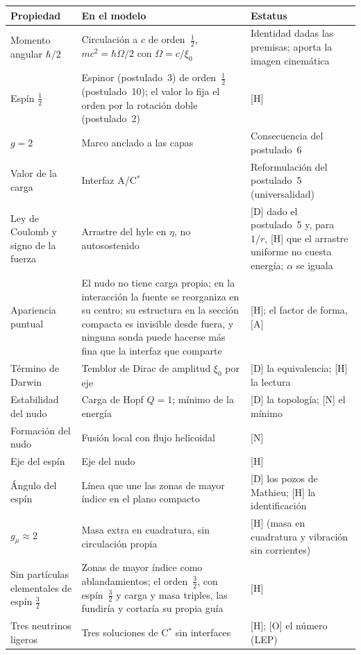 \documentclass[11pt,a4paper]{article}
\newcommand{\st}[1]{\textup{[#1]}}
\newcommand{\Cst}{C\ensuremath{^{*}}}
\begin{document}
\begin{center}
\small
\begin{tabularx}{\textwidth}{@{}>{\raggedright\arraybackslash}p{} Y Y@{}}
\toprule
Propiedad & En el modelo & Estatus \\
\midrule
Momento angular $\hbar/2$ & Circulación a $c$ de orden~$\tfrac12$, $mc^2=\hbar\Omega/2$ con $\Omega=c/\xi_0$ & Identidad dadas las premisas; aporta la imagen cinemática \\
Espín $\tfrac12$ & Espinor (postulado~3) de orden~$\tfrac12$ (postulado~10); el valor lo fija el orden por la rotación doble (postulado~2) & \st{H} \\
$g=2$ & Marco anclado a las capas & Consecuencia del postulado~6 \\
Valor de la carga & Interfaz A/\Cst & Reformulación del postulado~5 (universalidad) \\
Ley de Coulomb y signo de la fuerza & Arrastre del hyle en $\eta$, no autosostenido & \st{D} dado el postulado~5 y, para $1/r$, \st{H} que el arrastre uniforme no cuesta energía; $\alpha$ se iguala \\
Apariencia puntual & El nudo no tiene carga propia; en la interacción la fuente se reorganiza en su centro; su estructura en la sección compacta es invisible desde fuera, y ninguna sonda puede hacerse más fina que la interfaz que comparte & \st{H}; el factor de forma, \st{A} \\
Término de Darwin & Temblor de Dirac de amplitud $\xi_0$ por eje & \st{D} la equivalencia; \st{H} la lectura \\
Estabilidad del nudo & Carga de Hopf $Q=1$; mínimo de la energía & \st{D} la topología; \st{N} el mínimo \\
Formación del nudo & Fusión local con flujo helicoidal & \st{N} \\
Eje del espín & Eje del nudo & \st{H} \\
Ángulo del espín & Línea que une las zonas de mayor índice en el plano compacto & \st{D} los pozos de Mathieu; \st{H} la identificación \\
$g_\mu\approx2$ & Masa extra en cuadratura, sin circulación propia & \st{H} (masa en cuadratura y vibración sin corrientes) \\
Sin partículas elementales de espín $\tfrac32$ & Zonas de mayor índice como ablandamientos; el orden~$\tfrac32$, con espín~$\tfrac32$ y carga y masa triples, las fundiría y cortaría su propia guía & \st{H} \\
Tres neutrinos ligeros & Tres soluciones de \Cst{} sin interfaces & \st{H}; \st{O} el número (LEP) \\
\bottomrule
\end{tabularx}
\end{center}
\end{document}
